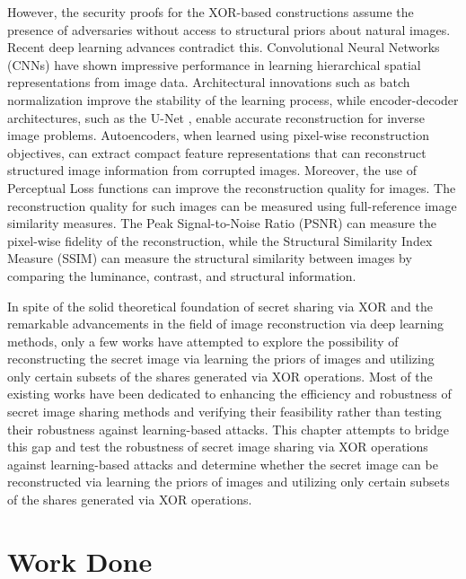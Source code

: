 However, the security proofs for the XOR-based constructions assume the presence of adversaries without access to structural priors about natural images. Recent deep learning advances contradict this. Convolutional Neural Networks (CNNs) \cite{lecun1998gradient} have shown impressive performance in learning hierarchical spatial representations from image data. Architectural innovations such as batch normalization \cite{ioffe2015batch} improve the stability of the learning process, while encoder-decoder architectures, such as the U-Net \cite{ronneberger2015unet}, enable accurate reconstruction for inverse image problems. Autoencoders, when learned using pixel-wise reconstruction objectives, can extract compact feature representations that can reconstruct structured image information from corrupted images. Moreover, the use of Perceptual Loss functions \cite{johnson2016perceptual} can improve the reconstruction quality for images. The reconstruction quality for such images can be measured using full-reference image similarity measures. The Peak Signal-to-Noise Ratio (PSNR) can measure the pixel-wise fidelity of the reconstruction, while the Structural Similarity Index Measure (SSIM) \cite{wang2004image} can measure the structural similarity between images by comparing the luminance, contrast, and structural information.

In spite of the solid theoretical foundation of secret sharing via XOR and the remarkable advancements in the field of image reconstruction via deep learning methods, only a few works have attempted to explore the possibility of reconstructing the secret image via learning the priors of images and utilizing only certain subsets of the shares generated via XOR operations. Most of the existing works have been dedicated to enhancing the efficiency and robustness of secret image sharing methods and verifying their feasibility rather than testing their robustness against learning-based attacks. This chapter attempts to bridge this gap and test the robustness of secret image sharing via XOR operations against learning-based attacks and determine whether the secret image can be reconstructed via learning the priors of images and utilizing only certain subsets of the shares generated via XOR operations.


\section{Work Done}
\label{sec:lad-work}


